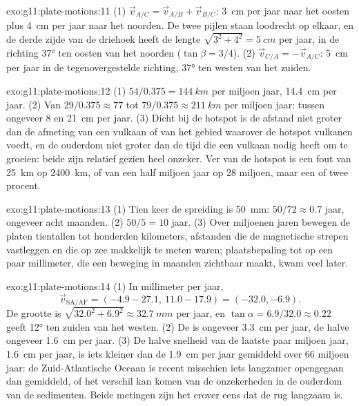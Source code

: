 \begin{solution}{exo:g11:plate-motions:11}
(1) $\vec v_{A/C} = \vec v_{A/B} + \vec v_{B/C}$: \qty{3}{cm} per jaar naar het oosten plus
\qty{4}{cm} per jaar naar het noorden. De twee pijlen staan loodrecht op elkaar, en
de derde zijde van de driehoek heeft de lengte $\sqrt{3^2 + 4^2} = \qty{5}{cm}$ per jaar,
in de richting \ang{37} ten oosten van het noorden ($\tan\beta = 3/4$). (2) $\vec v_{C/A}
= -\vec v_{A/C}$: \qty{5}{cm} per jaar in de tegenovergestelde richting, \ang{37} ten
westen van het zuiden.
\end{solution}

\begin{solution}{exo:g11:plate-motions:12}
(1) $54/0.375 = \qty{144}{km}$ per miljoen jaar, \qty{14.4}{cm} per jaar. (2)
Van $29/0.375 \approx 77$ tot $79/0.375 \approx \qty{211}{km}$ per miljoen
jaar: tussen ongeveer 8 en \qty{21}{cm} per jaar. (3) Dicht bij de hotspot is de
afstand niet groter dan de afmeting van een vulkaan of van het gebied waarover
de hotspot vulkanen voedt, en de ouderdom niet groter dan de tijd die een vulkaan
nodig heeft om te groeien: beide zijn relatief gezien heel onzeker. Ver van de
hotspot is een fout van \qty{25}{km} op \qty{2400}{km}, of van een half miljoen jaar
op 28 miljoen, maar een of twee procent.
\end{solution}

\begin{solution}{exo:g11:plate-motions:13}
(1) Tien keer de spreiding is \qty{50}{mm}: $50/72 \approx 0.7$ jaar, ongeveer
acht maanden. (2) $50/5 = 10$ jaar. (3) Over miljoenen jaren bewegen de platen
tientallen tot honderden kilometers, afstanden die de magnetische strepen
vastleggen en die op zee makkelijk te meten waren; plaatsbepaling tot op een paar
millimeter, die een beweging in maanden zichtbaar maakt, kwam veel later.
\end{solution}

\begin{solution}{exo:g11:plate-motions:14}
(1) In millimeter per jaar,
\[
  \vec v_{\mathrm{SA/AF}} = (-4.9 - 27.1,\ 11.0 - 17.9) = (-32.0, -6.9).
\] De grootte is $\sqrt{32.0^2 + 6.9^2} \approx
\qty{32.7}{mm}$ per jaar, en $\tan\alpha = 6.9/32.0 \approx 0.22$ geeft
\ang{12} ten zuiden van het westen. (2) De  is ongeveer
\qty{3.3}{cm} per jaar, de halve ongeveer \qty{1.6}{cm} per jaar. (3) De halve
snelheid van de laatste paar miljoen jaar, \qty{1.6}{cm} per jaar, is iets kleiner
dan de \qty{1.9}{cm} per jaar gemiddeld over 66 miljoen jaar: de Zuid-Atlantische
Oceaan is recent misschien iets langzamer opengegaan dan gemiddeld, of het verschil
kan komen van de onzekerheden in de ouderdom van de sedimenten. Beide metingen zijn
het erover eens dat de rug langzaam is.
\end{solution}

